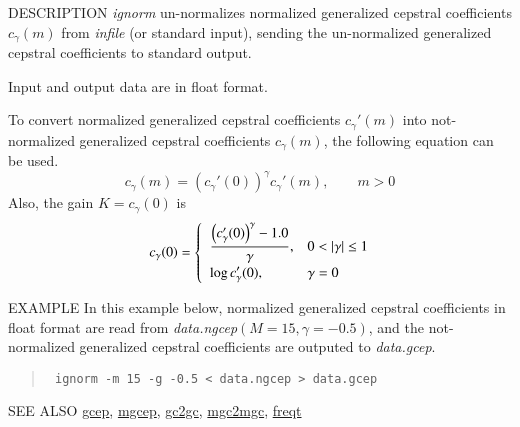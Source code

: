 \begin{qsection}{DESCRIPTION}
{\em ignorm} un-normalizes normalized generalized cepstral coefficients
$c_\gamma(m)$ from {\em infile} (or standard input), 
sending the un-normalized generalized cepstral coefficients 
to standard output.

Input and output data are in float format.

To convert normalized generalized cepstral coefficients
$c_\gamma'(m)$ into not-normalized generalized cepstral coefficients
$c_\gamma(m)$, the following equation can be used.
\begin{displaymath}
c_\gamma(m) = \left( c_\gamma'(0) \right)^{\gamma} c_\gamma'(m), \qquad m>0
\end{displaymath}
Also, the gain $K = c_\gamma(0)$ is
\begin{displaymath}
c_\gamma(0) = \begin{cases} \;\; \displaystyle
	  \frac{\Bigl(c_\gamma'(0)\Bigr)^{\gamma} - 1.0}{\gamma},
		& 0<|\gamma|\leq 1 \\ \;\; \displaystyle
	  \log c_\gamma'(0),  & \gamma=0
	\end{cases}
\end{displaymath}
\end{qsection}

\begin{options}
\end{options}

\begin{qsection}{EXAMPLE}
In this example below,
normalized generalized cepstral coefficients in
float format are read from {\em data.ngcep}$(M=15, \gamma=-0.5)$,
and the not-normalized generalized cepstral coefficients
are outputed to {\em data.gcep}.
\begin{quote}
 \verb! ignorm -m 15 -g -0.5 < data.ngcep > data.gcep!
\end{quote} 
\end{qsection}

\begin{qsection}{SEE ALSO}
\hyperlink{gcep}{gcep},
\hyperlink{mgcep}{mgcep},
\hyperlink{gc2gc}{gc2gc},
\hyperlink{mgc2mgc}{mgc2mgc},
\hyperlink{freqt}{freqt}
\end{qsection}
